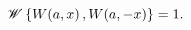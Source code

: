 \[\mathop{\mathscr{W}\/}\nolimits\left\{\mathop{W\/}\nolimits\!\left(a,x\right),%
\mathop{W\/}\nolimits\!\left(a,-x\right)\right\}=1.\]